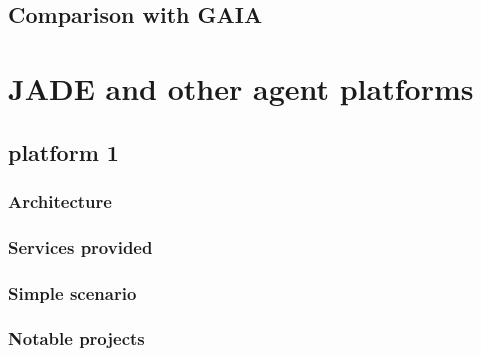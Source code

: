 \documentclass[a4paper,11pt]{report}
\begin{document}
  \subsection{Comparison with GAIA}

  
  
  
  \section{JADE and other agent platforms} %
  
  
  \subsection{platform 1} %
  
  \subsubsection{Architecture}
  
  \subsubsection{Services provided}
  
  \subsubsection{Simple scenario}
  
  \subsubsection{Notable projects}
  
\end{document}
